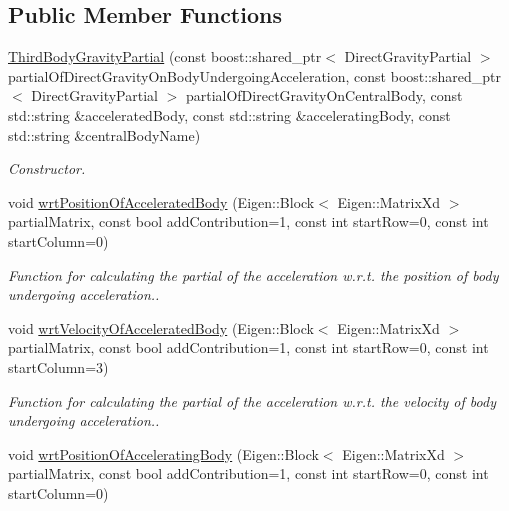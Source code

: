 \subsection*{Public Member Functions}
\begin{DoxyCompactItemize}
\item 
\hyperlink{classtudat_1_1acceleration__partials_1_1ThirdBodyGravityPartial_a2a037fc3041209eb1e90c6c81eadf74a}{Third\+Body\+Gravity\+Partial} (const boost\+::shared\+\_\+ptr$<$ Direct\+Gravity\+Partial $>$ partial\+Of\+Direct\+Gravity\+On\+Body\+Undergoing\+Acceleration, const boost\+::shared\+\_\+ptr$<$ Direct\+Gravity\+Partial $>$ partial\+Of\+Direct\+Gravity\+On\+Central\+Body, const std\+::string \&accelerated\+Body, const std\+::string \&accelerating\+Body, const std\+::string \&central\+Body\+Name)
\begin{DoxyCompactList}\small\item\em Constructor. \end{DoxyCompactList}\item 
void \hyperlink{classtudat_1_1acceleration__partials_1_1ThirdBodyGravityPartial_a780444d24c04f163289bc07270fb8cd5}{wrt\+Position\+Of\+Accelerated\+Body} (Eigen\+::\+Block$<$ Eigen\+::\+Matrix\+Xd $>$ partial\+Matrix, const bool add\+Contribution=1, const int start\+Row=0, const int start\+Column=0)
\begin{DoxyCompactList}\small\item\em Function for calculating the partial of the acceleration w.\+r.\+t. the position of body undergoing acceleration.. \end{DoxyCompactList}\item 
void \hyperlink{classtudat_1_1acceleration__partials_1_1ThirdBodyGravityPartial_a860887635000af38bde2c6730314a312}{wrt\+Velocity\+Of\+Accelerated\+Body} (Eigen\+::\+Block$<$ Eigen\+::\+Matrix\+Xd $>$ partial\+Matrix, const bool add\+Contribution=1, const int start\+Row=0, const int start\+Column=3)
\begin{DoxyCompactList}\small\item\em Function for calculating the partial of the acceleration w.\+r.\+t. the velocity of body undergoing acceleration.. \end{DoxyCompactList}\item 
void \hyperlink{classtudat_1_1acceleration__partials_1_1ThirdBodyGravityPartial_aca6b0aa5f7ae9e0164de033242d10c53}{wrt\+Position\+Of\+Accelerating\+Body} (Eigen\+::\+Block$<$ Eigen\+::\+Matrix\+Xd $>$ partial\+Matrix, const bool add\+Contribution=1, const int start\+Row=0, const int start\+Column=0)

\end{DoxyCompactItemize}
